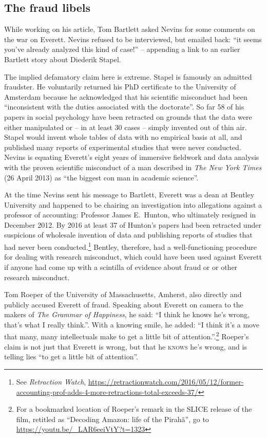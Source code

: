 \documentclass[output=paper,colorlinks,citecolor=brown
]{langscibook}
\begin{document}
\subsection{The fraud libels}

While working on his \citeyear{Bartlett12} article, Tom Bartlett asked
Nevins for some comments on the war on Everett. Nevins refused to be
interviewed, but emailed back: ``it seems you've already analyzed this
kind of case!'' -- appending a link to an earlier Bartlett story about
Diederik Stapel.

The implied defamatory claim here is extreme. Stapel is famously an
admitted fraudster. He voluntarily returned his PhD certificate to
the University of Amsterdam because he acknowledged that his scientific
misconduct had been ``inconsistent with the duties associated with the
doctorate''. So far 58 of his papers in social psychology have been
retracted on grounds that the data were either manipulated or -- in
at least 30 cases -- simply invented out of thin air. Stapel would
invent whole tables of data with no empirical basis at all, and
published many reports of experimental studies that were never
conducted. Nevins is equating Everett's eight years of immersive
fieldwork and data analysis with the proven scientific misconduct of
a man described in \textit{The New York Times} (26 April 2013) as
``the biggest con man in academic science''.

At the time Nevins sent his message to Bartlett, Everett was a dean
at Bentley University and happened to be chairing an investigation
into allegations against a professor of accounting: Professor James
E.\ Hunton, who ultimately resigned in December 2012. By 2016 at
least 37 of Hunton's papers had been retracted under suspicions of
wholesale invention of data and publishing reports of studies that
had never been conducted.\footnote{\label{retraction}%
   See \textit{Retraction Watch},
   \url{https://retractionwatch.com/2016/05/12/former-accounting-prof-adds-4-more-retractions-total-exceeds-37/}}
Bentley, therefore, had a well-functioning procedure for dealing with
research misconduct, which could have been used against Everett if
anyone had come up with a scintilla of evidence about fraud or or other
research misconduct.

Tom Roeper of the University of Massachusetts, Amherst, also directly
and publicly accused Everett of fraud. Speaking about Everett on camera
to the makers of \textit{The Grammar of Happiness}, he said: ``I think he
knows he's wrong, that's what I really think.''. With a knowing smile, he
added: ``I think it's a move that many, many intellectuals make to get a
little bit of attention.''.\footnote{\label{roeper}%
   For a bookmarked location of Roeper's remark in the SLICE release
   of the film, retitled as ``Decoding Amazon: life of the Pirah{\~a}'',
   go to \url{https://youtu.be/_LAR6eeiVtY?t=1323}}
Roeper's claim is not just that Everett is wrong, but that he
\textsc{knows} he's wrong, and is telling lies ``to get a little bit
of attention''.
\end{document}
